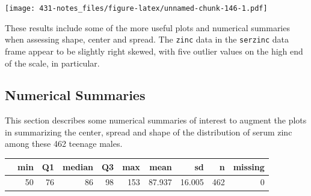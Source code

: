 \documentclass[
]{book}
\newenvironment{Shaded}{\begin{snugshade}}{\end{snugshade}}
\newcommand{\DataTypeTok}[1]{\textcolor[rgb]{0.13,0.29,0.53}{#1}}
\newcommand{\DecValTok}[1]{\textcolor[rgb]{0.00,0.00,0.81}{#1}}
\newcommand{\KeywordTok}[1]{\textcolor[rgb]{0.13,0.29,0.53}{\textbf{#1}}}
\newcommand{\NormalTok}[1]{#1}
\newcommand{\OperatorTok}[1]{\textcolor[rgb]{0.81,0.36,0.00}{\textbf{#1}}}
\newcommand{\StringTok}[1]{\textcolor[rgb]{0.31,0.60,0.02}{#1}}
\begin{document}
\texttt{[image: 431-notes\_files/figure-latex/unnamed-chunk-146-1.pdf]}

These results include some of the more useful plots and numerical summaries when assessing shape, center and spread. The \texttt{zinc} data in the \texttt{serzinc} data frame appear to be slightly right skewed, with five outlier values on the high end of the scale, in particular.

\hypertarget{numerical-summaries}{%
\subsection{Numerical Summaries}\label{numerical-summaries}}

This section describes some numerical summaries of interest to augment the plots in summarizing the center, spread and shape of the distribution of serum zinc among these 462 teenage males.

\begin{Shaded}
\end{Shaded}

\begin{tabular}{l|r|r|r|r|r|r|r|r|r}
\hline
  & min & Q1 & median & Q3 & max & mean & sd & n & missing\\
\hline
 & 50 & 76 & 86 & 98 & 153 & 87.937 & 16.005 & 462 & 0\\
\hline
\end{tabular}

\begin{Shaded}
\end{Shaded}
\end{document}
